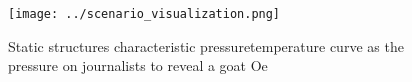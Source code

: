 \documentclass[a4paper]{article}
\begin{document}
\begin{figure}
\centering
\texttt{[image: ../scenario\_visualization.png]}
\caption{Static structures characteristic pressuretemperature curve as the pressure on journalists to reveal a goat Oe
}
\end{figure}
 
\end{document}
